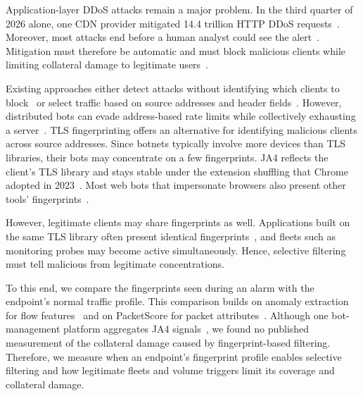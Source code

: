\documentclass[conference,letterpaper,10pt]{IEEEtran}
\newcommand\1{\textit{(i)}}
\newcommand\2{\textit{(ii)}}
\newcommand\3{\textit{(iii)}}
\newcommand\4{\textit{(iv)}}
\newcommand\5{\textit{(v)}}
\newcommand\6{\textit{(vi)}}
\newcommand\7{\textit{(vii)}}
\newcommand\8{\textit{(viii)}}
\newcommand\9{\textit{(ix)}}
\begin{document}
Application-layer DDoS attacks remain a major problem. In the third quarter of 2026 alone, one CDN provider mitigated 14.4 trillion HTTP DDoS requests~\cite{cloudflare2026q3ddos}. Moreover, most attacks end before a human analyst could see the alert~\cite{cloudflare2026q3ddos}. Mitigation must therefore be automatic and must block malicious clients while limiting collateral damage to legitimate users~\cite{soldo2012filtering,dietzel2018stellar}.

Existing approaches either detect attacks without identifying which clients to block~\cite{tripathi2021application,belcastro2025klage} or select traffic based on source addresses and header fields~\cite{soldo2012filtering,mahajan2002pushback,alcoz2022accturbo}. However, distributed bots can evade address-based rate limits while collectively exhausting a server~\cite{cambiaso2013slowdos}. TLS fingerprinting offers an alternative for identifying malicious clients across source addresses. Since botnets typically involve more devices than TLS libraries, their bots may concentrate on a few fingerprints. JA4 reflects the client's TLS library and stays stable under the extension shuffling that Chrome adopted in 2023~\cite{althouse2023ja4,foote2023chrome}. Most web bots that impersonate browsers also present other tools' fingerprints~\cite{li2021goodbot}.

However, legitimate clients may share fingerprints as well. Applications built on the same TLS library often present identical fingerprints~\cite{anderson2019tls}, and fleets such as monitoring probes may become active simultaneously. Hence, selective filtering must tell malicious from legitimate concentrations.

To this end, we compare the fingerprints seen during an alarm with the endpoint's normal traffic profile. This comparison builds on anomaly extraction for flow features~\cite{silveira2010urca,brauckhoff2009extraction} and on PacketScore for packet attributes~\cite{kim2006packetscore}. Although one bot-management platform aggregates JA4 signals~\cite{martinetti2024ja4signals}, we found no published measurement of the collateral damage caused by fingerprint-based filtering. Therefore, we measure when an endpoint's fingerprint profile enables selective filtering and how legitimate fleets and volume triggers limit its coverage and collateral damage.
\end{document}
